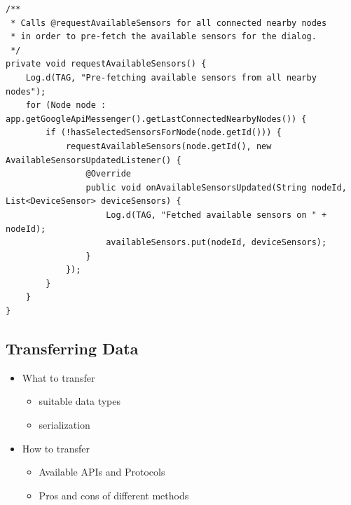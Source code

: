 \begin{lstlisting}[label=test]
/**
 * Calls @requestAvailableSensors for all connected nearby nodes
 * in order to pre-fetch the available sensors for the dialog.
 */
private void requestAvailableSensors() {
	Log.d(TAG, "Pre-fetching available sensors from all nearby nodes");
	for (Node node : app.getGoogleApiMessenger().getLastConnectedNearbyNodes()) {
		if (!hasSelectedSensorsForNode(node.getId())) {
			requestAvailableSensors(node.getId(), new AvailableSensorsUpdatedListener() {
				@Override
				public void onAvailableSensorsUpdated(String nodeId, List<DeviceSensor> deviceSensors) {
					Log.d(TAG, "Fetched available sensors on " + nodeId);
					availableSensors.put(nodeId, deviceSensors);
				}
			});
		}
	}
}
\end{lstlisting}

\lipsum[1]
\lipsum[2]
\lipsum[3]
\lipsum[4]
\lipsum[5]
\lipsum[1]
\lipsum[2]
\lipsum[3]
\lipsum[4]
\lipsum[5]

\subsection{Transferring Data}
\begin{itemize}[noitemsep]
	\item What to transfer
		\begin{itemize}
			\item suitable data types
			\item serialization
		\end{itemize}
	\item How to transfer
		\begin{itemize}
			\item Available APIs and Protocols
			\item Pros and cons of different methods
		\end{itemize}
\end{itemize}
\lipsum[1]
\lipsum[2]
\lipsum[3]
\lipsum[4]
\lipsum[5]
\lipsum[1]
\lipsum[2]
\lipsum[3]
\lipsum[4]
\lipsum[5]
\lipsum[2]
\lipsum[3]
\lipsum[4]
\lipsum[5]


\clearpage